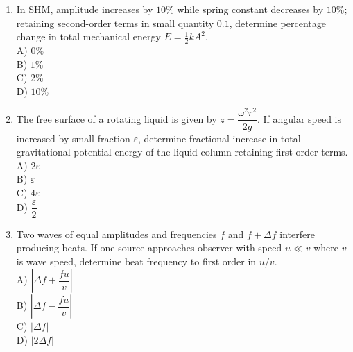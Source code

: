 \documentclass[12pt]{article}
\begin{document}
\begin{enumerate}
A) Contact point, zero acceleration\\

B) Contact point, non-zero acceleration\\

C) Center, zero acceleration\\

D) Infinity, zero acceleration

\item In SHM, amplitude increases by \(10\%\) while spring constant decreases by \(10\%\); retaining second-order terms in small quantity \(0.1\), determine percentage change in total mechanical energy \(E=\frac{1}{2}kA^2\).\\

A) \(0\%\)\\

B) \(1\%\)\\

C) \(2\%\)\\

D) \(10\%\)

\item The free surface of a rotating liquid is given by \(z=\dfrac{\omega^2 r^2}{2g}\). If angular speed is increased by small fraction \(\varepsilon\), determine fractional increase in total gravitational potential energy of the liquid column retaining first-order terms.\\

A) \(2\varepsilon\)\\

B) \(\varepsilon\)\\

C) \(4\varepsilon\)\\

D) \(\dfrac{\varepsilon}{2}\)

\item Two waves of equal amplitudes and frequencies \(f\) and \(f+\Delta f\) interfere producing beats. If one source approaches observer with speed \(u\ll v\) where \(v\) is wave speed, determine beat frequency to first order in \(u/v\).\\

A) \(\left|\Delta f+\dfrac{fu}{v}\right|\)\\

B) \(\left|\Delta f-\dfrac{fu}{v}\right|\)\\

C) \(|\Delta f|\)\\

D) \(\left|2\Delta f\right|\)

\end{enumerate}
\end{document}
